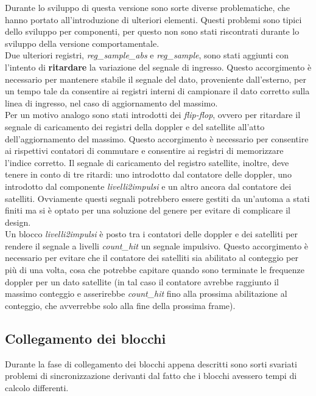 \documentclass[12pt,a4paper,twoside,openany]{book}
\begin{document}
Durante lo sviluppo di questa versione sono sorte diverse problematiche, che hanno portato all'introduzione di ulteriori elementi. Questi problemi sono tipici dello sviluppo per componenti, per questo non sono stati riscontrati durante lo sviluppo della versione comportamentale. \\
Due ulteriori registri, \textit{reg\_sample\_abs} e \textit{reg\_sample}, sono stati aggiunti con l'intento di \textbf{ritardare} la variazione del segnale di ingresso. Questo accorgimento è necessario per mantenere stabile il segnale del dato, proveniente dall'esterno, per un tempo tale da consentire ai registri interni di campionare il dato corretto sulla linea di ingresso, nel caso di aggiornamento del massimo.\\
Per un motivo analogo sono stati introdotti dei \textit{flip-flop}, ovvero per ritardare il segnale di caricamento dei registri della doppler e del satellite all'atto dell'aggiornamento del massimo. Questo accorgimento è necessario per consentire ai rispettivi contatori di commutare e consentire ai registri di memorizzare l'indice corretto. Il segnale di caricamento del registro satellite, inoltre, deve tenere in conto di tre ritardi: uno introdotto dal contatore delle doppler, uno introdotto dal componente \textit{livelli2impulsi} e un altro ancora dal contatore dei satelliti. Ovviamente questi segnali potrebbero essere gestiti da un'automa a stati finiti ma si è optato per una soluzione del genere per evitare di complicare il design.\\
Un blocco \textit{livelli2impulsi} è posto tra i contatori delle doppler e dei satelliti per rendere il segnale a livelli \textit{count\_hit} un segnale impulsivo. Questo accorgimento è necessario per evitare che il contatore dei satelliti sia abilitato al conteggio per più di una volta, cosa che potrebbe capitare quando sono terminate le frequenze doppler per un dato satellite (in tal caso il contatore avrebbe raggiunto il massimo conteggio e asserirebbe \textit{count\_hit} fino alla prossima abilitazione al conteggio, che avverrebbe solo alla fine della prossima frame).\\
\clearpage
\subsection{Collegamento dei blocchi}
Durante la fase di collegamento dei blocchi appena descritti sono sorti svariati problemi di sincronizzazione derivanti dal fatto che i blocchi avessero tempi di calcolo differenti. 
\end{document}
